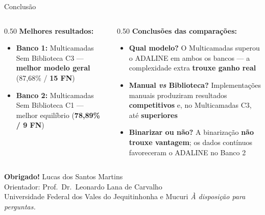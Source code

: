 \documentclass[aspectratio=169,11pt,brazil]{beamer}
\begin{document}
\begin{frame}{Conclusão}
  \begin{columns}[T]
    \begin{column}{0.50\textwidth}
      \textbf{Melhores resultados:}
      \begin{itemize}\setlength{\itemsep}{4pt}
        \item \textbf{Banco 1:} Multicamadas Sem Biblioteca C3 — \textbf{melhor modelo geral} (87,68\% / \textbf{15 FN})
        \item \textbf{Banco 2:} Multicamadas Sem Biblioteca C1 — melhor equilíbrio (\textbf{78,89\% / 9 FN})
      \end{itemize}
    \end{column}
    \begin{column}{0.50\textwidth}
      \textbf{Conclusões das comparações:}
      \begin{itemize}\setlength{\itemsep}{4pt}
        \item \textbf{Qual modelo?} O Multicamadas superou o ADALINE em ambos os bancos — a complexidade extra \textbf{trouxe ganho real}
        \item \textbf{Manual \textit{vs} Biblioteca?} Implementações manuais produziram resultados \textbf{competitivos} e, no Multicamadas C3, até \textbf{superiores}
        \item \textbf{Binarizar ou não?} A binarização \textbf{não trouxe vantagem}; os dados contínuos favoreceram o ADALINE no Banco 2
      \end{itemize}
    \end{column}
  \end{columns}
\end{frame}

\begin{frame}[plain]
  \centering
  \vfill
  {\Huge\color{ufvjmblue}\textbf{Obrigado!}}
  \vfill
  {\large Lucas dos Santos Martins}\\[0.3em]
  {\normalsize Orientador: Prof.\ Dr.\ Leonardo Lana de Carvalho}\\[0.3em]
  {\small Universidade Federal dos Vales do Jequitinhonha e Mucuri}
  \vfill
  {\normalsize\itshape À disposição para perguntas.}
  \vfill
\end{frame}
\end{document}
